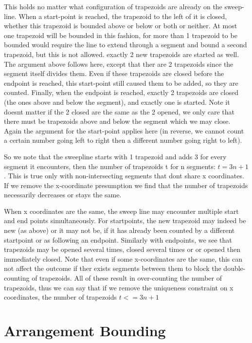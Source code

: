 \documentclass{article}
\begin{document}
This holds no matter what configuration of trapezoids are already on the sweep-line.
When a start-point is reached, the trapezoid to the left of it is closed, whether this trapezoid is bounded above or below or both or neither.
At most one trapezoid will be bounded in this fashion, for more than 1 trapezoid to be bounded would require the line to extend through a segment and bound a second trapezoid, but this is not allowed.
exactly 2 new trapezoids are started as well.
The argument above follows here, except that ther are 2 trapezoids since the segment itself divides them.
Even if these trapezoids are closed before the endpoint is reached, this start-point still caused them to be added, so they are counted.
Finally, when the endpoint is reached, exactly 2 trapezoids are closed (the ones above and below the segment), and exactly one is started.
Note it doesnt matter if the 2 closed are the same as the 2 opened, we only care that there must be trapezoids above and below the segment which we may close.
Again the argument for the start-point applies here (in reverse, we cannot count a certain number going left to right then a different number going right to left).

So we note that the sweepline starts with 1 trapezoid and adds 3 for every segment it encounters, then the number of trapezoids t for n segments: $t = 3n + 1$.
This is true only with non-intersecting segments that dont share x coordinates.
If we remove the x-coordinate presumption we find that the number of trapezoids necessarily decreases or stays the same.

When x coordinates are the same, the sweep line may encounter multiple start and end points simultaneously.
For startpoints, the new trapezoid may indeed be new (as above) or it may not be, if it has already been counted by a different startpoint or as following an endpoint.
Similarly with endpoints, we see that trapezoids may be opened several times, closed several times or or opened then immediately closed.
Note that even if some x-coordinates are the same, this can  not affect the outcome if ther exists segments between them to block the double-counting of trapezoids.
All of these result in over-counting the number of trapezoids, thus we can say that if we remove the uniqueness constraint on x coordinates, the number of trapezoids $t <= 3n + 1$

\section {Arrangement Bounding}
\end{document}
